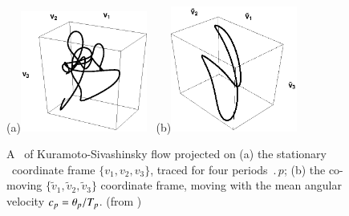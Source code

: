 %
\begin{figure}[ht]
(a)\includegraphics[width=0.37\textwidth, clip=true]
                    {../figs/ks22rpo033.50_04.045E2.eps}
~(b)\includegraphics[width=0.37\textwidth, clip=true]
                     {../figs/ks22rpo033.50_04.045E2CM.eps}
\caption{
 A \rpo\ of Kuramoto-Sivashinsky flow projected on
 (a) the stationary \statesp\ coordinate frame
 $\{v_1,v_2,v_3\}$, traced for four periods
 $\period{p}$;
 (b) the co-moving $\{\tilde{v}_1,\tilde{v}_2,\tilde{v}_3\}$
 coordinate frame, moving with the mean angular velocity
 $c_p={\bf \theta}_p/{T_{p}}$.
\hfill (from )
}
\label{f:MeanVelocityFrame}
\end{figure}


